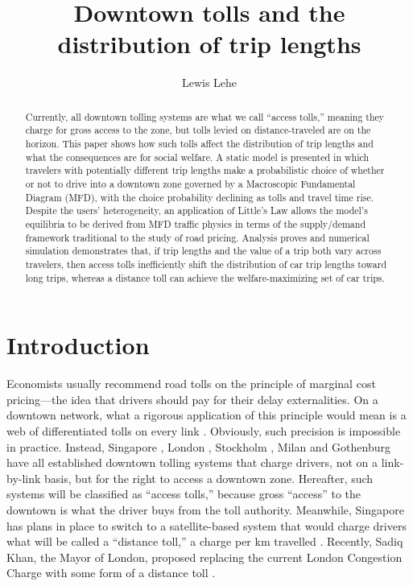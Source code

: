 \documentclass[preprint,authoryear]{elsarticle}
\begin{document}
\title{Downtown tolls and the distribution of trip lengths }

\author[ll]{Lewis Lehe }

\address[ll]{UC Berkeley, Department of Civil and Environmental Engineering \\ lewis500@berkeley.edu \\ http://lewislehe.com}

\begin{abstract}

Currently, all downtown tolling systems are what we call ``access tolls,'' meaning they charge for gross access to the zone, but tolls levied on distance-traveled are on the horizon. This paper shows how such tolls affect the distribution of trip lengths and what the consequences are for social welfare. A static model is presented in which travelers with potentially different trip lengths make a probabilistic choice of whether or not to drive into a downtown zone governed by a Macroscopic Fundamental Diagram (MFD), with the choice probability declining as tolls and travel time rise. Despite the users' heterogeneity, an application of Little's Law allows the model's equilibria to be derived from MFD traffic physics in terms of the supply/demand framework traditional to the study of road pricing.  Analysis proves and numerical simulation demonstrates that, if trip lengths and the value of a trip both vary across travelers, then access tolls inefficiently shift the distribution of car trip lengths toward long trips, whereas a distance toll can achieve the welfare-maximizing set of car trips.

\end{abstract}
\maketitle

\section{Introduction}

Economists usually recommend road tolls on the principle of marginal cost pricing---the idea that drivers should pay for their delay externalities. On a downtown network, what a rigorous application of this principle would mean is a web of differentiated tolls on every link \citep{Beckmann1956,YangHuang1998}. Obviously, such precision is impossible in practice. Instead,  Singapore \citep{Santos2004}, London \citep{santos2008,Leape2006}, Stockholm \citep{Eliasson2014}, Milan \citep{Gibson2015} and Gothenburg \citep{Borjesson2015} have all established downtown tolling systems that charge drivers, not on a link-by-link basis, but for the right to access a downtown zone. Hereafter, such systems will be classified as ``access tolls,'' because gross ``access'' to the downtown is what the driver buys from the toll authority. Meanwhile, Singapore has plans in place to switch to a satellite-based system that would charge drivers what will be called a ``distance toll,'' a charge per km travelled \citep{Tan2016}. Recently, Sadiq Khan, the Mayor of London, proposed replacing the current London Congestion Charge with some form of a distance toll \citep{Topham2017}.
\end{document}
